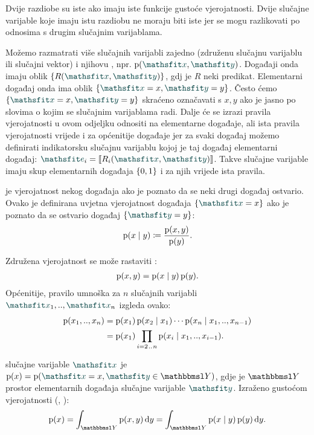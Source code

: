 \documentclass[utf8, diplomski, lmodern]{fer}
\begin{document}
Dvije razdiobe su iste ako imaju iste funkcije gustoće vjerojatnosti. Dvije slučajne varijable koje imaju istu razdiobu ne moraju biti iste jer se mogu razlikovati po odnosima s drugim slučajnim varijablama.

Možemo razmatrati više slučajnih varijabli zajedno (združenu slučajnu varijablu ili slučajni vektor) i njihovu , npr. $\p(\rvar x,\rvar y)$. Događaji onda imaju oblik $\cbr{R(\rvar x,\rvar y)}$, gdj je $R$ neki predikat. Elementarni događaj onda ima oblik $\cbr{\rvar x=x, \rvar y=y}$. Često ćemo $\cbr{\rvar x=x, \rvar y=y}$ skraćeno označavati s $x, y$ ako je jasno po slovima o kojim se slučajnim varijablama radi. Dalje će se izrazi pravila vjerojatnosti u ovom odjeljku odnositi na elementarne događaje, ali ista pravila vjerojatnosti vrijede i za općenitije događaje jer za svaki događaj možemo definirati indikatorsku slučajnu varijablu kojoj je taj događaj elementarni događaj: $\rvar e_i = \enbbracket{R_i(\rvar x, \rvar y)}$. Takve slučajne varijable imaju skup elementarnih događaja $\cbr{0,1}$ i za njih vrijede ista pravila.

 je vjerojatnost nekog događaja ako je poznato da se neki drugi događaj ostvario. Ovako je definirana uvjetna vjerojatnost događaja $\cbr{\rvar x=x}$ ako je poznato da se ostvario događaj $\cbr{\rvar y=y}$:
\begin{align} \label{eq:uvjetna-vj}
\operatorname*{\mathrm{p}}(x\mid y) \coloneqq \frac{\operatorname*{\mathrm{p}}(x,y)}{\operatorname*{\mathrm{p}}(y)}  \text{.}
\end{align}

Združena vjerojatnost se može rastaviti : 
\begin{align}  \label{eq:pravilo-umnoska-bin}
\operatorname*{\mathrm{p}}(x,y) = \operatorname*{\mathrm{p}}(x\mid y)\operatorname*{\mathrm{p}}(y) \text{.}
\end{align}
Općenitije, pravilo umnoška za $n$ slučajnih varijabli $\rvar x_1,..,\rvar x_n$ izgleda ovako:
\begin{align} \label{eq:pravilo-umnoska}
\operatorname*{\mathrm{p}}(x_1,..,x_n) 
&=\operatorname*{\mathrm{p}}(x_1)\operatorname*{\mathrm{p}}(x_2\mid x_1)\cdots\operatorname*{\mathrm{p}}(x_n\mid x_1,..,x_{n-1})  \\
&=\operatorname*{\mathrm{p}}(x_1)\prod_{i=2\mkern1.5mu{..}\mkern1.5mu n}\operatorname*{\mathrm{p}}(x_i\mid x_1,..,x_{i-1})  \text{.}
\end{align}

 slučajne varijable $\rvar x$ je $\p(x)=\p(\rvar x=x,\rvar y\in\set Y)$, gdje je $\set Y$ prostor elementarnih događaja slučajne varijable $\rvar y$. Izraženo gustoćom vjerojatnosti (, ):
\begin{align}
\p(x) = \int_{\set Y}\p(x,y)\dif y = \int_{\set Y}\p(x\mid y)\p(y)\dif y \text{.}
\end{align}
\end{document}
